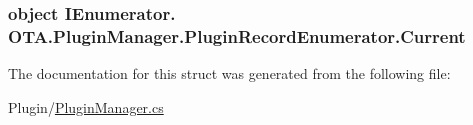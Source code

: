 \subsubsection[{Current}]{\setlength{\rightskip}{0pt plus 5cm}object I\+Enumerator. O\+T\+A.\+Plugin\+Manager.\+Plugin\+Record\+Enumerator.\+Current\hspace{0.3cm}{\ttfamily [get]}}\label{struct_o_t_a_1_1_plugin_manager_1_1_plugin_record_enumerator_a830eb690217632c0130a521b53b27fd0}


The documentation for this struct was generated from the following file\+:\begin{DoxyCompactItemize}
\item 
Plugin/\hyperlink{_plugin_manager_8cs}{Plugin\+Manager.\+cs}\end{DoxyCompactItemize}
